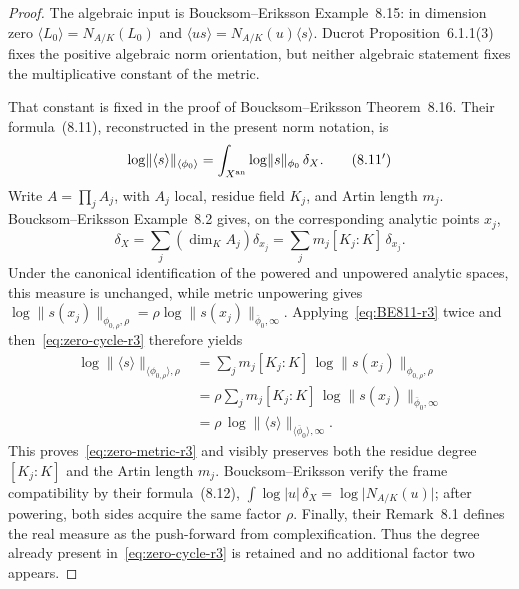 \documentclass[11pt]{article}
\newcommand{\norm}[1]{\lVert#1\rVert}
\newcommand{\abs}[1]{\lvert#1\rvert}
\begin{document}
\begin{proof}
The algebraic input is Boucksom--Eriksson Example~8.15: in dimension zero
$\langle L_0\rangle=N_{A/K}(L_0)$ and
$\langle us\rangle=N_{A/K}(u)\langle s\rangle$.  Ducrot
Proposition~6.1.1(3) fixes the positive algebraic norm orientation, but
neither algebraic statement fixes the multiplicative constant of the
metric.

That constant is fixed in the proof of Boucksom--Eriksson Theorem~8.16.
Their formula~(8.11), reconstructed in the present norm notation, is
\begin{equation}
 \log\norm{\langle s\rangle}_{\langle\phi_0\rangle}
 =\int_{X^{\rm an}}\log\norm{s}_{\phi_0}\,\delta_X.
\tag{8.11$'$}\label{eq:BE811-r3}
\end{equation}
Write $A=\prod_jA_j$, with $A_j$ local, residue field $K_j$, and Artin
length $m_j$.  Boucksom--Eriksson Example~8.2 gives, on the corresponding
analytic points $x_j$,
\begin{equation}
 \delta_X=\sum_j(\dim_KA_j)\delta_{x_j}
 =\sum_jm_j[K_j:K]\,\delta_{x_j}.
\tag{2.2}\label{eq:zero-cycle-r3}
\end{equation}
Under the canonical identification of the powered and unpowered analytic
spaces, this measure is unchanged, while metric unpowering gives
$\log\norm{s(x_j)}_{\phi_{0,\rho},\rho}
 =\rho\log\norm{s(x_j)}_{\overline\phi_0,\infty}$.
Applying~\eqref{eq:BE811-r3} twice and then~\eqref{eq:zero-cycle-r3}
therefore yields
\begin{align*}
 \log\norm{\langle s\rangle}_{\langle\phi_{0,\rho}\rangle,\rho}
 &=\sum_jm_j[K_j:K]\,
   \log\norm{s(x_j)}_{\phi_{0,\rho},\rho}\\
 &=\rho\sum_jm_j[K_j:K]\,
   \log\norm{s(x_j)}_{\overline\phi_0,\infty}\\
 &=\rho\,
   \log\norm{\langle s\rangle}_{\langle\overline\phi_0\rangle,\infty}.
\end{align*}
This proves~\eqref{eq:zero-metric-r3} and visibly preserves both the residue
degree $[K_j:K]$ and the Artin length $m_j$.  Boucksom--Eriksson verify the
frame compatibility by their formula~(8.12),
$\int\log\abs u\,\delta_X=\log\abs{N_{A/K}(u)}$; after powering, both
sides acquire the same factor $\rho$.  Finally, their Remark~8.1 defines
the real measure as the push-forward from complexification.  Thus the
degree already present in~\eqref{eq:zero-cycle-r3} is retained and no
additional factor two appears.
\end{proof}
\end{document}
